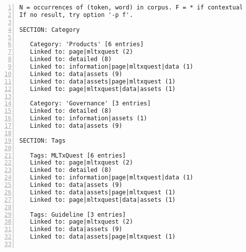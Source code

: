 \documentclass[10pt]{article}
\begin{document}
{\begin{lstlisting}[numbers=left,basicstyle=\ttfamily\footnotesize, frame=none]
N = occurrences of (token, word) in corpus. F = * if contextual pair.
If no result, try option '-p f'.

SECTION: Category

   Category: 'Products' [6 entries]                                Category: 'BI Solution' [1 entries]
   Linked to: page|mltxquest (2)                                   Linked to: detailed (8)
   Linked to: detailed (8)        
   Linked to: information|page|mltxquest|data (1)                  Category: 'Observability & Monitoring' [1 entries]
   Linked to: data|assets (9)                                      Linked to: detailed (8)
   Linked to: data|assets|page|mltxquest (1)        
   Linked to: page|mltxquest|data|assets (1)                       Category: 'One Platform' [1 entries]
                                                                   Linked to: detailed (8)
   Category: 'Governance' [3 entries]        
   Linked to: detailed (8)        
   Linked to: information|assets (1)        
   Linked to: data|assets (9) 

SECTION: Tags

   Tags: MLTxQuest [6 entries]                                        Tags: metadata [2 entries]
   Linked to: page|mltxquest (2)                                      Linked to: detailed (8)
   Linked to: detailed (8)                                            Linked to: data|assets (9)
   Linked to: information|page|mltxquest|data (1)        
   Linked to: data|assets (9)                                         Tags: mltxquest [1 entries]
   Linked to: data|assets|page|mltxquest (1)                          Linked to: detailed (8)
   Linked to: page|mltxquest|data|assets (1)        
                                                                      Tags: business [1 entries]
   Tags: Guideline [3 entries]                                        Linked to: detailed (8)
   Linked to: page|mltxquest (2)        
   Linked to: data|assets (9)                                         Tags: products [1 entries]
   Linked to: data|assets|page|mltxquest (1)                          Linked to: detailed (8)
           

\end{lstlisting}}
\end{document}
